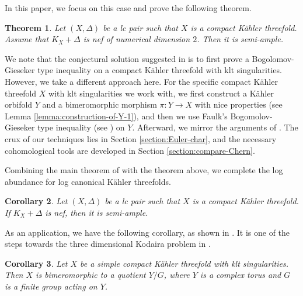 \documentclass[12pt]{amsart}
\newcommand{\<}{\leq}
\newtheorem{theorem}{Theorem}[section]
\newtheorem{corollary}[theorem]{Corollary}
\theoremstyle{remark}
\newtheorem{remark}[theorem]{Remark}
\theoremstyle{definition}
\theoremstyle{definition}
\numberwithin{equation}{section}
\theoremstyle{definition}
\theoremstyle{definition}
\begin{document}

In this paper, we focus on this case and prove the following  theorem. 
\begin{theorem}
\label{thm:lc-log-abundance}
Let $(X,\Delta)$ be a lc pair such that $X$ is a compact K\"ahler threefold. 
Assume that $K_X+\Delta$ is nef of numerical dimension $2$. 
Then it is semi-ample.
\end{theorem} 

    We note that the conjectural  solution suggested in \cite{CHP23} is to first prove a Bogolomov-Gieseker type inequality on a compact K\"ahler threefold with klt singularities. 
    However, we take a different approach here.  
     For the specific compact  K\"ahler threefold $X$ with klt singularities we work with,   we first construct a K\"ahler orbifold $Y$ and a bimeromorphic morphism $\pi:Y\to X$ with nice properties (see Lemma \ref{lemma:construction-of-Y-1}), and then we use Faulk's Bogomolov-Gieseker type inequality  (see \cite{Faulk2022}) on $Y$. 
     Afterward, we mirror the arguments of \cite[Chapter 14]{Kol92}. 
     The crux of our techniques lies in Section \ref{section:Euler-char}, and the necessary cohomological tools are developed in Section \ref{section:compare-Chern}. 



Combining the main theorem of \cite{DasOu2022} with the theorem above, we complete the log abundance for log canonical K\"ahler threefolds. 

\begin{corollary}
\label{cor:log-abundance}
Let $(X,\Delta)$ be a lc pair such that $X$ is a compact K\"ahler threefold. 
If $K_X+\Delta$ is nef, 
then it is semi-ample.
\end{corollary}

As an application, we have the following corollary, as shown in \cite[Theorem 1.2]{CHP16}.
It is one of the steps towards the three dimensional  Kodaira problem in \cite{Lin2017}. 

\begin{corollary}
\label{cor:simple-3fold}
Let $X$ be a simple compact K\"ahler threefold with klt singularities. 
Then $X$ is bimeromorphic to a quotient $Y/G$, where $Y$ is a complex torus and $G$ is a finite group acting on $Y$.
\end{corollary}
\end{document}
